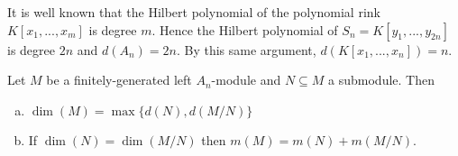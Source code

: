 \begin{example}\label{example:dim-of-Weyl-algebra}
	It is well known that the Hilbert polynomial of the polynomial rink $K[x_1,...,x_m]$ is degree $m$. Hence the Hilbert polynomial of $S_n = K[y_1,...,y_{2n}]$ is degree $2n$ and $d(A_n) = 2n$. By this same argument, $d(K[x_1,...,x_n]) = n$. 
\end{example}
\begin{prop}\label{prop:basic-dim-properties-A_n}
	Let $M$ be a finitely-generated left $A_n$-module and $N \subseteq M$ a submodule. Then
	\begin{enumerate}[(a)]
		\item $\dim(M) = \max\{d(N),d(M/N)\}$ 
		\item If $\dim(N) = \dim(M/N)$ then $m(M) = m(N) + m(M/N)$.
	\end{enumerate}
\end{prop}
